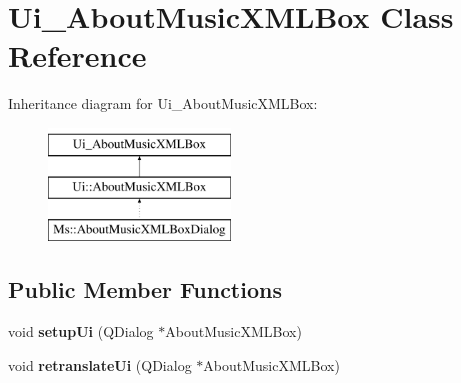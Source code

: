 \hypertarget{class_ui___about_music_x_m_l_box}{}\section{Ui\+\_\+\+About\+Music\+X\+M\+L\+Box Class Reference}
\label{class_ui___about_music_x_m_l_box}
Inheritance diagram for Ui\+\_\+\+About\+Music\+X\+M\+L\+Box\+:\begin{figure}[H]
\begin{center}
\leavevmode
\includegraphics[height=3.000000cm]{class_ui___about_music_x_m_l_box}
\end{center}
\end{figure}
\subsection*{Public Member Functions}
\begin{DoxyCompactItemize}
\item 
\mbox{\label{class_ui___about_music_x_m_l_box_ad6ac6c0852e16ff7be63b920339a4ba1}} 
void {\bfseries setup\+Ui} (Q\+Dialog $\ast$About\+Music\+X\+M\+L\+Box)
\item 
\mbox{\label{class_ui___about_music_x_m_l_box_a24ed51585a969de988f9d2e401a983cc}} 
void {\bfseries retranslate\+Ui} (Q\+Dialog $\ast$About\+Music\+X\+M\+L\+Box)
\end{DoxyCompactItemize}
